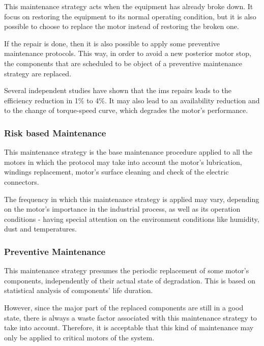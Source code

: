 This maintenance strategy acts when the equipment has already broke down. It focus on restoring the equipment to its normal operating condition, but it is also possible to choose to replace the motor instead of restoring the broken one. 

If the repair is done, then it is also possible to apply some preventive maintenance protocols. This way, in order to avoid a new posterior motor stop, the components that are scheduled to be object of a preventive maintenance strategy are replaced.

Several independent studies have shown that the \acrshort{ims} repairs leads to the efficiency reduction in 1\% to 4\%. It may also lead to an availability reduction and to the change of torque-speed curve, which degrades the motor's performance.


\subsubsection{Risk based Maintenance}
\label{subsubsec:risk_based_maintenance}

This maintenance strategy is the base maintenance procedure applied to all the motors in which the protocol may take into account the motor's lubrication, windings replacement, motor's surface cleaning and check of the electric connectors.

The frequency in which this maintenance strategy is applied may vary, depending on the motor's importance in the industrial process, as well as its operation conditions - having special attention on the environment conditions like humidity, dust and temperatures.

\subsubsection{Preventive Maintenance}
\label{subsubsec:preventive_maintenance}

This maintenance strategy presumes the periodic replacement of some motor's components, independently of their actual state of degradation.
This is based on statistical analysis of components' life duration.

However, since the major part of the replaced components are still in a good state, there is always a waste factor associated with this maintenance strategy to take into account. Therefore, it is acceptable that this kind of maintenance may only be applied to critical motors of the system.	


